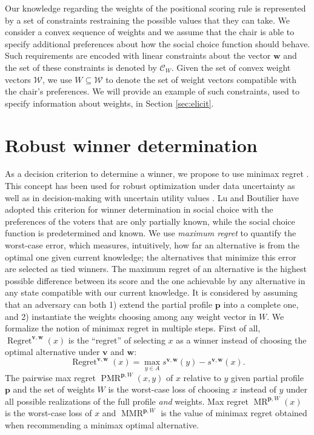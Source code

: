 \documentclass[a4paper,twoside]{article}
\newcommand{\profile}{\bm{v}}%
\newcommand{\pprofile}{{\bm{p}}}%
\newcommand{\w}{\bm{w}}
\newcommand{\W}{\mathcal{W}}
\newcommand{\Co}{\mathcal{C}}
\newcommand{\pw}{W}%
\DeclareMathOperator{\Regret}{Regret}
\DeclareMathOperator{\PMR}{PMR}
\DeclareMathOperator{\MR}{MR}
\DeclareMathOperator{\MMR}{MMR}
\begin{document}
Our knowledge regarding the weights of the positional scoring rule is represented by a set of constraints restraining the possible values that they can take. We consider a convex sequence of weights and we assume that the chair is able to specify additional preferences about how the social choice function should behave. 
Such requirements are encoded with linear constraints about the vector $\w$ and the set of these constraints is denoted by $\Co_W$. Given the set of convex weight vectors $\W$, we use $\pw \subseteq \W$ to denote the set of weight vectors compatible with the chair's preferences. We will provide an example of such constraints, used to specify information about weights, in Section \ref{sec:elicit}.

\section[Minimax regret under partial profile and weight information]{
Robust winner determination}
\label{sec:mmr}
As a decision criterion to determine a winner, we propose to use minimax regret \cite{Savage1954}. This concept has been used for robust optimization under data uncertainty \cite{Kouvelis1997} as well as in decision-making with uncertain utility values \cite{Salo2001,Boutilier2006}. Lu and Boutilier \cite{Lu2011} have adopted this criterion for winner determination in social choice with the preferences of the voters that are only partially known, while the social choice function is predetermined and known.
We use {\em maximum regret} to quantify the worst-case error, which measures, intuitively, how far an alternative is from the optimal one given current knowledge; the alternatives that minimize this error are selected as tied winners.
The maximum regret of an alternative is the highest possible difference between its score and the one achievable by any alternative in any state compatible with our current knowledge.
It is considered by assuming that an adversary can both 1) extend the partial profile $\pprofile$ into a complete one, and 2) instantiate the weights choosing among any weight vector in $\pw$.
We formalize the notion of minimax regret in multiple steps.
First of all, $\Regret^{\profile,\w}(x)$ is the “regret” of selecting $x$ as a winner instead of choosing the optimal alternative under $\profile$ and $\w$:
\[\Regret^{\profile,\w}(x) = \max_{y \in A} s^{\profile,\w}(y) - s^{\profile, \w}(x).\]
The pairwise max regret $\PMR^{\pprofile,W}(x,y)$ of $x$ relative to $y$ given partial profile $\pprofile$ and the set of weights $W$ is the worst-case loss of choosing $x$ instead of $y$ under all possible realizations of the full profile {\em and} weights. Max regret $\MR^{\pprofile,W}(x)$ is the worst-case loss of $x$ and $\MMR^{\pprofile,W}$ is the value of minimax regret obtained when recommending a minimax optimal alternative. 
\end{document}
